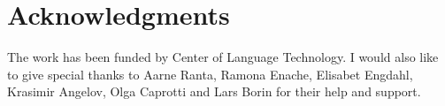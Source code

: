 \documentclass[submission]{eptcs} %
\begin{document}
\section{Acknowledgments}
The work has been funded by Center of Language Technology.
I would also like to give special thanks to Aarne Ranta, Ramona Enache,
Elisabet Engdahl, Krasimir Angelov, Olga Caprotti and Lars Borin for their help
and support.



\nocite{*}


\end{document}
